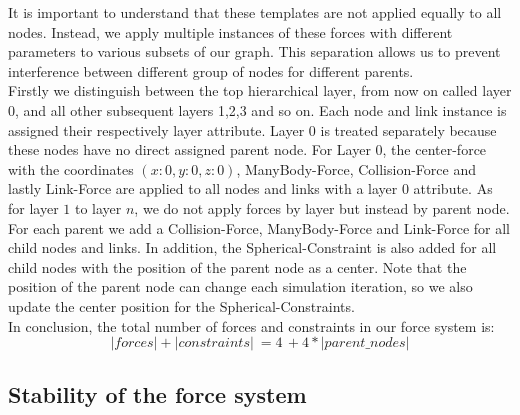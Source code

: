 It is important to understand that these templates are not applied equally to all nodes. Instead, we apply multiple instances of these forces with different parameters to various subsets of our graph. 
This separation allows us to prevent interference between different group of nodes for different parents.\\ 
Firstly we distinguish between the top hierarchical layer, from now on called layer $0$, and all other subsequent layers 1,2,3 and so on. Each node and link instance is assigned their respectively layer attribute. Layer $0$ is treated separately because these nodes have no direct assigned parent node. 
For Layer $0$, the center-force with the coordinates $(x:0,y:0,z:0)$, ManyBody-Force, Collision-Force and lastly Link-Force are applied to all nodes and links with a layer $0$ attribute. 
As for layer $1$ to layer $n$, we do not apply forces by layer but instead by parent node. For each parent we add a Collision-Force, ManyBody-Force and Link-Force for all child nodes and links. In addition, the Spherical-Constraint is also added for all child nodes with the position of the parent node as a center. Note that the position of the parent node can change each simulation iteration, so we also update the center position for the Spherical-Constraints.\\
In conclusion, the total number of forces and constraints in our force system is: 
\begin{equation}
    |forces| + |constraints| \: = 4 \, + 4 * |parent\_nodes|
\end{equation}

\subsection{Stability of the force system}

